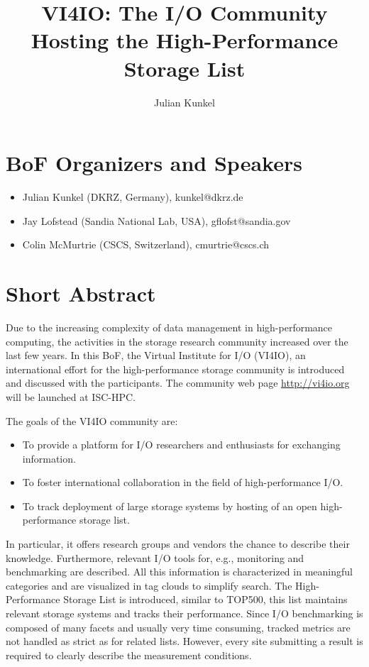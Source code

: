 \documentclass[a4paper,10pt]{article}
\title{VI4IO: The I/O Community Hosting the High-Performance Storage List}
\author{Julian Kunkel}
\begin{document}
\maketitle

\section{BoF Organizers and Speakers}
\begin{itemize}
  \item Julian Kunkel (DKRZ, Germany), kunkel@dkrz.de
  \item Jay Lofstead (Sandia National Lab, USA), gflofst@sandia.gov
  \item Colin McMurtrie (CSCS, Switzerland), cmurtrie@cscs.ch
\end{itemize}


\section{Short Abstract}  %
Due to the increasing complexity of data management in high-performance computing, the activities in the storage research community 
increased over the last few years.
In this BoF, the Virtual Institute for I/O (VI4IO), an international effort for the high-performance storage community is introduced and discussed with the participants.
The community web page \url{http://vi4io.org} will be launched at ISC-HPC.

The goals of the VI4IO community are:
\begin{itemize}
  \item To provide a platform for I/O researchers and enthusiasts for exchanging information.
  \item To foster international collaboration in the field of high-performance I/O.
  \item To track deployment of large storage systems by hosting of an open high-performance storage list.
\end{itemize}

In particular, it offers research groups and vendors the chance to describe their knowledge.
Furthermore, relevant I/O tools for, e.g., monitoring and benchmarking are described.
All this information is characterized in meaningful categories and are visualized in tag clouds to simplify search.
The High-Performance Storage List is introduced, similar to TOP500, this list maintains relevant storage systems and tracks their performance.
Since I/O benchmarking is composed of many facets and usually very time consuming, tracked metrics are not handled as strict as for related lists.
However, every site submitting a result is required to clearly describe the measurement conditions.
\end{document}
